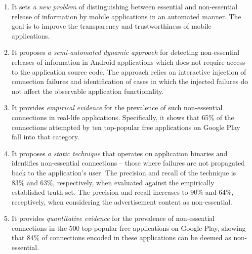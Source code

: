 \vspace{-0.05in}
\begin{enumerate}[leftmargin=0.5cm]\setlength{\itemsep}{-0.01in}

\item It sets \emph{a new problem} of distinguishing between essential and non-essential release of information by mobile applications in an automated manner. The goal is to improve the
transparency and trustworthiness of mobile applications.

\item It proposes \emph{a semi-automated dynamic approach} for detecting non-essential releases of information in Android applications which does not require access to the application source code. 
The approach relies on interactive injection of connection failures and identification of cases in which the injected failures do not affect the observable application functionality. 

\item It provides \emph{empirical evidence} for the prevalence of such non-essential connections in real-life applications. Specifically, it shows that 65\% of the connections attempted by ten top-popular free applications on Google Play fall into that category.    

\item It proposes \emph{a static technique} that operates on application binaries and identifies non-essential connections -- those where failures are not propagated back to the application's user. The precision and recall of the technique is 83\% and 63\%, respectively, when evaluated against the empirically established truth set. 
The precision and recall increases to 90\% and 64\%, receptively, when considering the advertisement content as non-essential.

\item It provides \emph{quantitative evidence} for the prevalence of non-essential connections in the 500 top-popular free applications on Google Play, showing that 84\% of connections encoded in these applications can be deemed as non-essential.

\end{enumerate}




